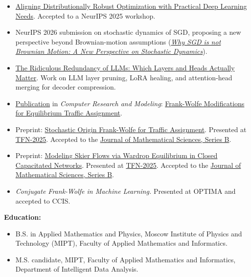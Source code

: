 \documentclass[a4paper, fontsize=11pt]{article}
\begin{document}
\begin{itemize}
    \item \href{https://arxiv.org/pdf/2508.16734}{Aligning Distributionally Robust Optimization with Practical Deep Learning Needs}. Accepted to a NeurIPS 2025 workshop.

    \item NeurIPS 2026 submission on stochastic dynamics of SGD, proposing a new perspective beyond Brownian-motion assumptions
    (\href{https://openreview.net/forum?id=qqzq4YOnAo&referrer=%5Bthe%20profile%20of%20Igor%20Ignashin%5D(%2Fprofile%3Fid%3D~Igor_Ignashin1)}{\textit{Why SGD is not Brownian Motion: A New Perspective on Stochastic Dynamics}}).

    \item \href{https://openreview.net/forum?id=KfuiwhQcJH}{The Ridiculous Redundancy of LLMs: Which Layers and Heads Actually Matter}. Work on LLM layer pruning, LoRA healing, and attention-head merging for decoder compression.

    \item \href{http://crm.ics.org.ru/journal/article/3433/}{Publication} in \textit{Computer Research and Modeling}: \href{https://crm.ics.org.ru/uploads/crmissues/crm_2024_1/14_ignashin.pdf}{Frank-Wolfe Modifications for Equilibrium Traffic Assignment}.

    \item Preprint: \href{https://arxiv.org/pdf/2509.23840}{Stochastic Origin Frank-Wolfe for Traffic Assignment}. Presented at \href{https://siriusmathcenter.ru/056w}{TFN-2025}. Accepted to the \href{https://mathbooks.ru/Springer-Sirius/}{Journal of Mathematical Sciences, Series B}.

    \item Preprint: \href{https://arxiv.org/abs/2509.13392}{Modeling Skier Flows via Wardrop Equilibrium in Closed Capacitated Networks}. Presented at \href{https://siriusmathcenter.ru/056w}{TFN-2025}. Accepted to the \href{https://mathbooks.ru/Springer-Sirius/}{Journal of Mathematical Sciences, Series B}.

    \item \textit{Conjugate Frank-Wolfe in Machine Learning.} Presented at OPTIMA and accepted to CCIS.

\end{itemize}

\textbf{Education:}
\begin{itemize}
    \item B.S. in Applied Mathematics and Physics, Moscow Institute of Physics and Technology (MIPT), Faculty of Applied Mathematics and Informatics.
    \item M.S. candidate, MIPT, Faculty of Applied Mathematics and Informatics, Department of Intelligent Data Analysis.
\end{itemize}
\end{document}
